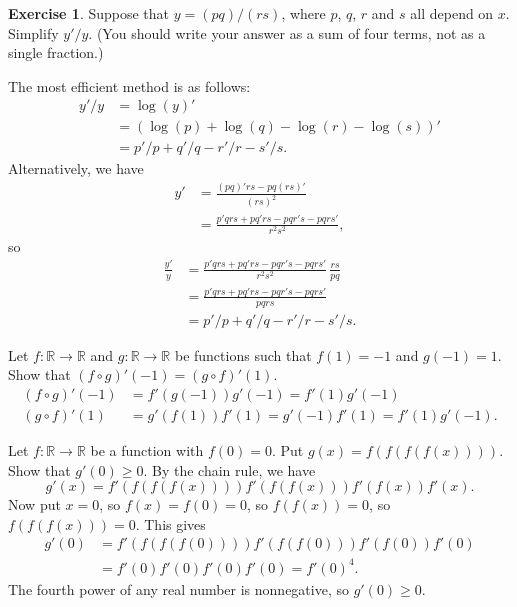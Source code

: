 \documentclass[a4paper]{book}
\newcommand{\R}         {{\mathbb{R}}}
\newcommand{\xra}       {\xrightarrow}
\renewcommand{\:}{\colon}
\theoremstyle{definition}
\newtheorem{exercise}[theorem]{Exercise}
\newenvironment{starex}{
 \renewcommand{\thetheorem}{\arabic{chapter}.\arabic{section}.\arabic{theorem}${}^*$}
 \exercise
}{\endexercise}
\renewenvironment{solution}{\SolutionInline}{\endSolutionInline}
\begin{document}
\begin{exercise}
 Suppose that $y=(pq)/(rs)$, where $p$, $q$, $r$ and $s$ all depend on
 $x$.  Simplify $y'/y$.  (You should write your answer as a sum of
 four terms, not as a single fraction.)
\end{exercise}
\begin{solution}
 The most efficient method is as follows:
 \begin{align*}
  y'/y &= \log(y)' \\
       &= (\log(p)+\log(q)-\log(r)-\log(s))' \\
       &= p'/p + q'/q - r'/r - s'/s.
 \end{align*}
 Alternatively, we have
 \begin{align*}
  y' &= \frac{(pq)'rs - pq(rs)'}{(rs)^2} \\
     &= \frac{p'qrs + pq'rs - pqr's - pqrs'}{r^2s^2},
 \end{align*}
 so
 \begin{align*}
  \frac{y'}{y} &= 
   \frac{p'qrs + pq'rs - pqr's - pqrs'}{r^2s^2} \, \frac{rs}{pq} \\
   &= \frac{p'qrs + pq'rs - pqr's - pqrs'}{pqrs} \\
   &= p'/p + q'/q - r'/r - s'/s.
 \end{align*}
\end{solution}

\begin{starex}
 Let $f\:\R\xra{}\R$ and $g\:\R\xra{}\R$ be functions such that
 $f(1)=-1$ and $g(-1)=1$.  Show that
 $(f\circ g)'(-1)=(g\circ f)'(1)$.
\end{starex}
\begin{solution}
 \begin{align*}
  (f\circ g)'(-1) &= f'(g(-1)) g'(-1) = f'(1) g'(-1) \\
  (g\circ f)'(1)  &= g'(f(1)) f'(1) = g'(-1) f'(1) = f'(1) g'(-1).
 \end{align*}
\end{solution}

\begin{starex}
 Let $f\:\R\xra{}\R$ be a function with $f(0)=0$.  Put
 $g(x)=f(f(f(f(x))))$.  Show that $g'(0)\geq 0$.
\end{starex}
\begin{solution}
 By the chain rule, we have
 \[ g'(x) = f'(f(f(f(x)))) f'(f(f(x))) f'(f(x)) f'(x). \]
 Now put $x=0$, so $f(x)=f(0)=0$, so $f(f(x))=0$, so $f(f(f(x)))=0$.
 This gives
 \begin{align*}
  g'(0) &= f'(f(f(f(0)))) f'(f(f(0))) f'(f(0)) f'(0) \\
        &= f'(0) f'(0) f'(0) f'(0) = f'(0)^4.
 \end{align*}
 The fourth power of any real number is nonnegative, so
 $g'(0)\geq 0$.
\end{solution}
\end{document}
